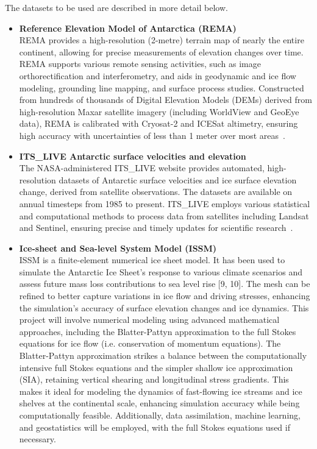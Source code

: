 \documentclass[10pt,a4paper]{article}
\begin{document}
The datasets to be used are described in more detail below.
\begin{itemize}
    \item\textbf{Reference Elevation Model of Antarctica (REMA)}\\
    REMA provides a high-resolution (2-metre) terrain map of nearly the entire continent, allowing for precise measurements of elevation changes over time. REMA supports various remote sensing activities, such as image orthorectification and interferometry, and aids in geodynamic and ice flow modeling, grounding line mapping, and surface process studies. Constructed from hundreds of thousands of Digital Elevation Models (DEMs) derived from high-resolution Maxar satellite imagery (including WorldView and GeoEye data), REMA is calibrated with Cryosat-2 and ICESat altimetry, ensuring high accuracy with uncertainties of less than 1 meter over most areas~\cite{REMA}.

    \item\textbf{ITS\_LIVE Antarctic surface velocities and elevation}\\
    The NASA-administered ITS\_LIVE website provides automated, high-resolution datasets of Antarctic surface velocities and ice surface elevation change, derived from satellite observations. The datasets are available on annual timesteps from 1985 to present. ITS\_LIVE employs various statistical and computational methods to process data from satellites including Landsat and Sentinel, ensuring precise and timely updates for scientific research~\cite{itslive}.

    \item\textbf{Ice-sheet and Sea-level System Model (ISSM)}~\cite{ISSM}\\
    ISSM is a finite-element numerical ice sheet model. It has been used to simulate the Antarctic Ice Sheet’s response to various climate scenarios and assess future mass loss contributions to sea level rise [9, 10]. The mesh can be refined to better capture variations in ice flow and driving stresses, enhancing the simulation’s accuracy of surface elevation changes and ice dynamics. This project will involve numerical modeling using advanced mathematical approaches, including the Blatter-Pattyn approximation to the full Stokes equations for ice flow (i.e. conservation of momentum equations). The Blatter-Pattyn approximation strikes a balance between the computationally intensive full Stokes equations and the simpler shallow ice approximation (SIA), retaining vertical shearing and longitudinal stress gradients. This makes it ideal for modeling the dynamics of fast-flowing ice streams and ice shelves at the continental scale, enhancing simulation accuracy while being computationally feasible. Additionally, data assimilation, machine learning, and geostatistics will be employed, with the full Stokes equations used if necessary.
    \end{itemize}
\end{document}
